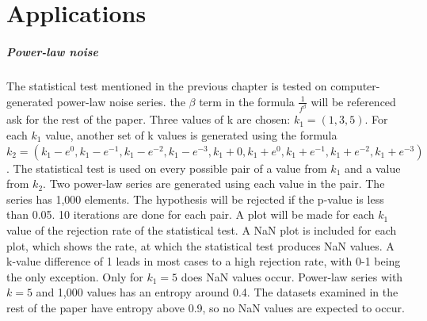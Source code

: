 \chapter{Applications}
\paragraph{Power-law noise}
The statistical test mentioned in the previous chapter is tested on computer-generated power-law noise series.\cite{Timmer1995} the $\beta$ term in the formula $\frac{1}{f^{\beta}}$ will be referenced ask for the rest of the paper. Three values of k are chosen: $k_1=(1,3,5)$. For each $k_1$ value, another set of k values is generated using the formula $k_2=(k_1-e^0,k_1-e^{-1},k_1-e^{-2},k_1-e^{-3},k_1+0,k_1+e^0,k_1+e^{-1},k_1+e^{-2},k_1+e^{-3})$. The statistical test is used on every possible pair of a value from $k_1$ and a value from $k_2$. Two power-law series are generated using each value in the pair. The series has 1,000 elements. The hypothesis will be rejected if the p-value is less than 0.05. 10 iterations are done for each pair. A plot will be made for each $k_1$ value of the rejection rate of the statistical test. A NaN plot is included for each plot, which shows the rate, at which the statistical test produces NaN values. A k-value difference of 1 leads in most cases to a high rejection rate, with 0-1 being the only exception. Only for $k_1=5$ does NaN values occur. Power-law series with $k=5$ and 1,000 values has an entropy around 0.4. The datasets examined in the rest of the paper have entropy above 0.9, so no NaN values are expected to occur.



